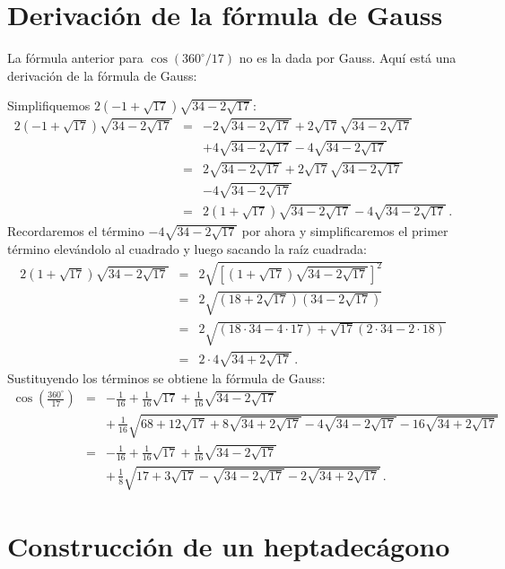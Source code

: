 \section{Derivación de la fórmula de Gauss}\label{s.derivation}

La fórmula anterior para $\cos(360^\circ /17)$ no es la dada por Gauss. Aquí está una derivación de la fórmula de Gauss:

Simplifiquemos $2(-1+\sqrt{17})\sqrt{34-2\sqrt{17}}$:
\begin{eqnarray*}
2(-1+\sqrt{17})\sqrt{34-2\sqrt{17}} &=&
-2\sqrt{34-2\sqrt{17}} +2\sqrt{17}\sqrt{34-2\sqrt{17}}\\
&&+4\sqrt{34-2\sqrt{17}}-4\sqrt{34-2\sqrt{17}}\\
&=&
2\sqrt{34-2\sqrt{17}} +2\sqrt{17}\sqrt{34-2\sqrt{17}}\\
&&-4\sqrt{34-2\sqrt{17}}\\
&=&2(1+\sqrt{17})\sqrt{34-2\sqrt{17}}-4\sqrt{34-2\sqrt{17}}\,.
\end{eqnarray*}
Recordaremos el término $-4\sqrt{34-2\sqrt{17}}$ por ahora y simplificaremos el primer término elevándolo al cuadrado y luego sacando la raíz cuadrada:
\begin{eqnarray*}
2(1+\sqrt{17})\sqrt{34-2\sqrt{17}}&=&
2\sqrt{\left[(1+\sqrt{17})\sqrt{34-2\sqrt{17}}\right]^2}\\
&=&2\sqrt{(18+2\sqrt{17})(34-2\sqrt{17})}\\
&=&2\sqrt{(18\cdot 34-4\cdot17)+\sqrt{17}(2\cdot 34 - 2\cdot 18)}\\
&=&2\cdot 4\sqrt{34+2\sqrt{17}}\,.
\end{eqnarray*}
Sustituyendo los términos se obtiene la fórmula de Gauss:
\begin{eqnarray*}
\cos\left(\frac{360^\circ}{17}\right) &=&
-\frac{1}{16}+\frac{1}{16}\sqrt{17} + 
     \frac{1}{16}\sqrt{34-2\sqrt{17}} \\
    &&
     +\,\frac{1}{16}\sqrt{
     68+12\sqrt{17} + 
     8\sqrt{34+2\sqrt{17}}-4\sqrt{34-2\sqrt{17}}
   -16
     \sqrt{34+2\sqrt{17}}
   }\\
&=&-\frac{1}{16}+\frac{1}{16}\sqrt{17} + 
     \frac{1}{16}\sqrt{34-2\sqrt{17}}\\
&&+\,\frac{1}{8}\sqrt{
     17+3\sqrt{17} - 
     \sqrt{34-2\sqrt{17}}
   -2
     \sqrt{34+2\sqrt{17}}
   }\,.
\end{eqnarray*}

\section{Construcción de un heptadecágono}\label{s.construction}


